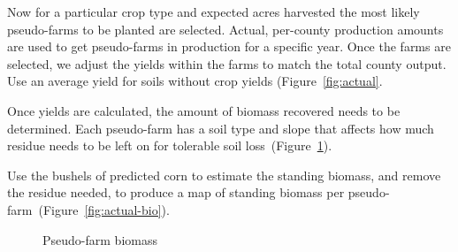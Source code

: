 \documentclass{elsart}
\begin{document}
Now for a particular crop type and expected acres harvested the most
likely pseudo-farms to be planted are selected. Actual, per-county
production amounts are used to get pseudo-farms in production for a
specific year.  Once the farms are selected, we adjust the yields
within the farms to match the total county output. Use an average
yield for soils without crop yields (Figure~\ref{fig:actual}.

Once yields are calculated, the amount of biomass recovered needs to
be determined. Each pseudo-farm has a soil type and slope that affects
how much residue needs to be left on for tolerable soil
loss~(Figure~\ref{fig:biomass}).

Use the bushels of predicted corn to estimate the standing biomass,
and remove the residue needed, to produce a map of standing biomass
per pseudo-farm~(Figure~\ref{fig:actual-bio}).


\begin{figure}[hpt]
  \centering
  \label{fig:biomass}
  \caption{Pseudo-farm biomass}
\end{figure}
\end{document}
